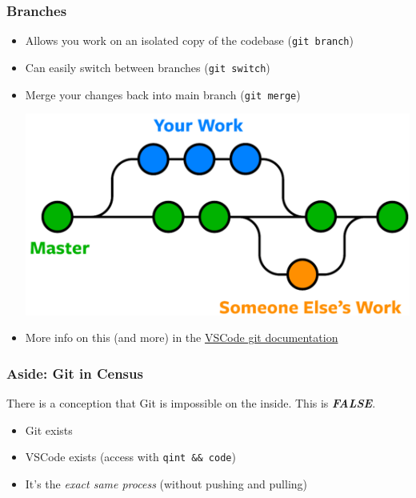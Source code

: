 \documentclass{ali-presentation}
\begin{document}
\begin{frame}
    \frametitle{Branches}

    \begin{itemize}[<+->]
        \item Allows you work on an isolated copy of the codebase (\texttt{git branch})
        \item Can easily switch between branches (\texttt{git switch})
        \item Merge your changes back into main branch (\texttt{git merge})
        \pause
        \begin{center}
            \includegraphics[width=.5\textwidth]{figures/branch.png}
        \end{center}
        \pause
        \item More info on this (and more) in the \href{https://code.visualstudio.com/docs/sourcecontrol/overview}{VSCode git documentation}
    \end{itemize}

\end{frame}

\begin{frame}
    \frametitle{Aside: Git in Census}

    There is a conception that Git is impossible on the inside.
    \pause
    This is \emph{\color{red} \textbf{FALSE}}.

    \bigskip \pause
    
    \begin{itemize}[<+->]
        \item Git exists
        \item VSCode exists (access with \texttt{qint \&\& code})
        \item It's the \emph{exact same process} (without pushing and pulling)
    \end{itemize}

\end{frame}
\end{document}
